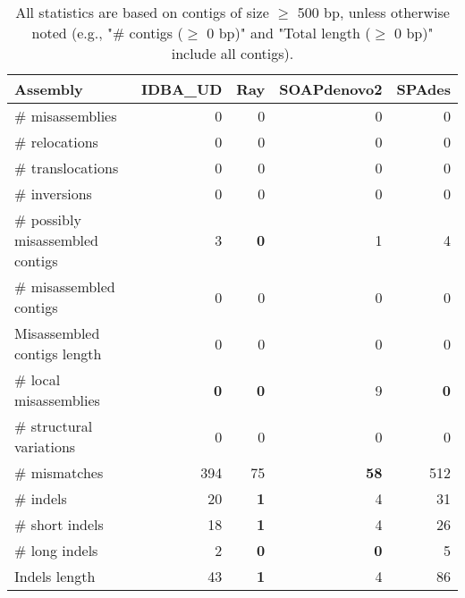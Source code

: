 \documentclass[12pt,a4paper]{article}
\begin{document}
\begin{table}[ht]
\begin{center}
\caption{All statistics are based on contigs of size $\geq$ 500 bp, unless otherwise noted (e.g., "\# contigs ($\geq$ 0 bp)" and "Total length ($\geq$ 0 bp)" include all contigs).}
\begin{tabular}{|l*{4}{|r}|}
\hline
Assembly & IDBA\_UD & Ray & SOAPdenovo2 & SPAdes \\ \hline
\# misassemblies & 0 & 0 & 0 & 0 \\ \hline
\hspace{5mm}\# relocations & 0 & 0 & 0 & 0 \\ \hline
\hspace{5mm}\# translocations & 0 & 0 & 0 & 0 \\ \hline
\hspace{5mm}\# inversions & 0 & 0 & 0 & 0 \\ \hline
\# possibly misassembled contigs & 3 & {\bf 0} & 1 & 4 \\ \hline
\# misassembled contigs & 0 & 0 & 0 & 0 \\ \hline
Misassembled contigs length & 0 & 0 & 0 & 0 \\ \hline
\# local misassemblies & {\bf 0} & {\bf 0} & 9 & {\bf 0} \\ \hline
\# structural variations & 0 & 0 & 0 & 0 \\ \hline
\# mismatches & 394 & 75 & {\bf 58} & 512 \\ \hline
\# indels & 20 & {\bf 1} & 4 & 31 \\ \hline
\hspace{5mm}\# short indels & 18 & {\bf 1} & 4 & 26 \\ \hline
\hspace{5mm}\# long indels & 2 & {\bf 0} & {\bf 0} & 5 \\ \hline
Indels length & 43 & {\bf 1} & 4 & 86 \\ \hline
\end{tabular}
\end{center}
\end{table}
\end{document}
